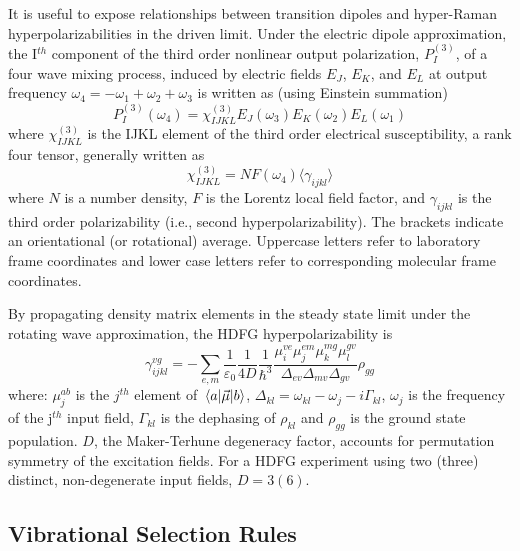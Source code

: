 \documentclass[aip, jcp, reprint, twocolumn]{revtex4-2}
\begin{document}
It is useful to expose relationships between transition dipoles and hyper-Raman hyperpolarizabilities in the driven limit. \cite{Simpson2004}
Under the electric dipole approximation, the I$^{th}$ component of the third order nonlinear output polarization, ${P}^{(3)}_I$, of a four wave mixing process, induced by electric fields $E_J$, $E_K$, and $E_L$ at output frequency $\omega_4=-\omega_1 + \omega_2 + \omega_3$ is written as (using Einstein summation) \cite{RN307}
\begin{equation} \label{polarization}
{P}^{(3)}_I (\omega_4)  = \chi^{(3)}_{IJKL} E_J(\omega_3) E_K(\omega_2) E_L(\omega_1) 
\end{equation}
where $\chi^{(3)}_{IJKL}$ is the IJKL element of the third order electrical susceptibility, a rank four tensor, generally written as
\begin{equation}
	\chi^{(3)}_{IJKL} = NF(\omega_4) \langle \gamma_{ijkl} \rangle
\end{equation}
where $N$ is a number density, $F$ is the Lorentz local field factor, and $\gamma_{ijkl}$ is the third order polarizability (i.e., second hyperpolarizability). 
The brackets indicate an orientational (or rotational) average.\cite{Andrews1977}
Uppercase letters refer to laboratory frame coordinates and lower case letters refer to corresponding molecular frame coordinates.

By propagating density matrix elements in the steady state limit under the rotating wave approximation, the HDFG hyperpolarizability is \cite{RN133}
\begin{equation}\label{sivegamma}
		\gamma_{ijkl}^{vg} =	- \sum_{e,m} \frac{1}{\varepsilon_0} \frac{1}{4D} \frac{1}{\hbar^3} \frac{\mu^{ve}_{i} \mu^{em}_{j} \mu^{mg}_{k} \mu^{gv}_{l} }{\Delta_{ev} \Delta_{mv}\Delta_{gv}}  \rho_{gg}
\end{equation}
where: $\mu^{ab}_{j}$ is the $j^{th}$ element of $\mel{a}{\vec{\mu}}{b}$, $\Delta_{kl} = \omega_{kl} - \omega_{j} - i\Gamma_{kl}$, $\omega_j$ is the frequency of the j$^{th}$ input field, $\Gamma_{kl}$ is the dephasing of $\rho_{kl}$ and $\rho_{gg}$ is the ground state population.
$D$, the Maker-Terhune degeneracy factor, accounts for permutation symmetry of the excitation fields.\cite{RN134} 
For a HDFG experiment using two (three) distinct, non-degenerate input fields, $D = 3 (6)$.

\subsection{Vibrational Selection Rules}
\end{document}

